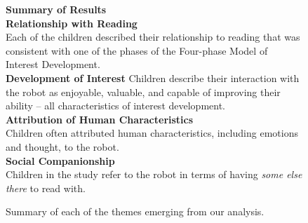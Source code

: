 \documentclass{sigchi}
\begin{document}
\begin{figure}
	\vspace{2mm}
	\textbf{Summary of Results}\\
	\textbf{Relationship with Reading} \\
	Each of the children described their relationship to reading that was consistent with one of the phases of the Four-phase Model of Interest Development. \\
	
	\textbf{Development of Interest}
	Children describe their interaction with the robot as enjoyable, valuable, and capable of improving their ability -- all characteristics of interest development.\\
	
	\textbf{Attribution of Human Characteristics} \\
	Children often attributed human characteristics, including emotions and thought, to the robot.\\
	
	\textbf{Social Companionship} \\
	Children in the study refer to the robot in terms of having \textit{some else there} to read with.\\
	\caption{Summary of each of the themes emerging from our analysis.}
	\label{fig:figure4}
\end{figure}
\end{document}
